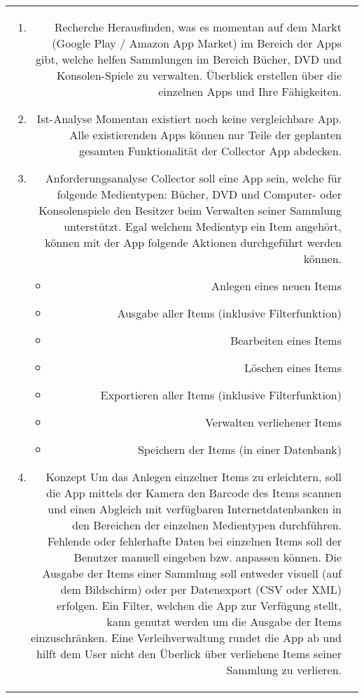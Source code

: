 \begin{longtable}{rp{12cm}}
\begin{enumerate}
	\item Recherche \newline
		Herausfinden, was es momentan auf dem Markt (Google Play / Amazon App Market) im Bereich der Apps gibt, welche helfen Sammlungen im Bereich Bücher, DVD und
		Konsolen-Spiele zu verwalten. Überblick erstellen über die einzelnen Apps und Ihre Fähigkeiten.
	  \item Ist-Analyse \newline
		Momentan existiert noch keine vergleichbare App. Alle existierenden Apps können nur Teile der geplanten gesamten Funktionalität der Collector App abdecken.
	  \item Anforderungsanalyse \newline
		Collector soll eine App sein, welche für folgende Medientypen: Bücher, DVD und Computer- oder Konsolenspiele den Besitzer beim Verwalten seiner Sammlung unterstützt. Egal welchem Medientyp ein Item angehört, können mit der App folgende Aktionen durchgeführt werden können.
	  \begin{itemize}
		\item Anlegen eines neuen Items
		\item Ausgabe aller Items (inklusive Filterfunktion)
		\item Bearbeiten eines Items
		\item Löschen eines Items
		\item Exportieren aller Items (inklusive Filterfunktion)
		\item Verwalten verliehener Items
		\item Speichern der Items (in einer Datenbank)
	  \end{itemize}
	  \item Konzept \newline
		Um das Anlegen einzelner Items zu erleichtern, soll die App mittels der Kamera den Barcode des Items scannen und einen Abgleich mit verfügbaren Internetdatenbanken in den Bereichen der einzelnen Medientypen durchführen. Fehlende oder fehlerhafte Daten bei einzelnen Items soll der Benutzer manuell eingeben bzw. anpassen können. Die Ausgabe der Items einer Sammlung soll entweder visuell (auf dem Bildschirm) oder per Datenexport (CSV oder XML) erfolgen. Ein Filter, welchen die App zur Verfügung stellt, kann genutzt werden um die Ausgabe der Items einzuschränken. Eine Verleihverwaltung rundet die App ab und hilft dem User nicht den Überlick über verliehene Items seiner Sammlung zu verlieren.
	\end{enumerate} \\

\end{longtable}
